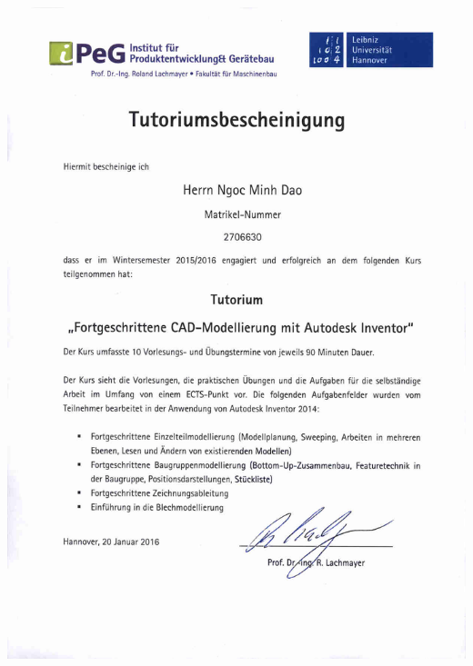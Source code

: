 \documentclass[12pt,a4paper]{scrartcl}
\begin{document}
\includegraphics [width=\linewidth, height=\textheight] {./zeugnisse/ipeg_autodesk_inventor_lq.jpg}
\end{document}
